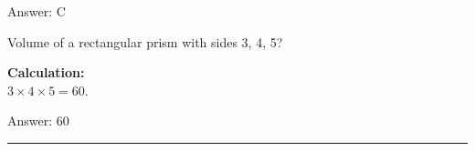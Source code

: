 \documentclass[11pt,paper=a4,answers]{exam}
\begin{document}
\begin{questions}
\begin{solution}
\vspace{30pt}

Answer: \colorbox{yellow!100}{C}
\end{solution}

\vspace{60pt}

\question
Volume of a rectangular prism with sides 3, 4, 5?

\begin{solution}
\textbf{Calculation:} \\
$3 \times 4 \times 5 = 60$.

\vspace{30pt}

Answer: \colorbox{yellow!100}{60}
\end{solution}




\end{questions}
\begin{center}
\rule{.5\textwidth}{1pt}
\end{center}
\end{document}
